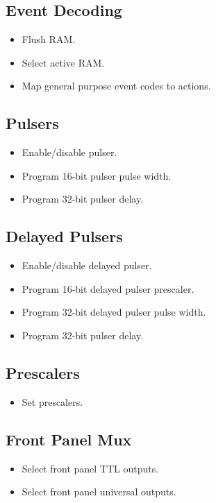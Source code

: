 \documentclass[a4paper,10pt]{article}
\begin{document}
	\subsection{Event Decoding}
	\begin{itemize}
		\item Flush RAM.
		\item Select active RAM.
		\item Map general purpose event codes to actions.
	\end{itemize}

	\subsection{Pulsers}
	\begin{itemize}
		\item Enable/disable pulser.
		\item Program 16-bit pulser pulse width.
		\item Program 32-bit pulser delay.
	\end{itemize}

	\subsection{Delayed Pulsers}
	\begin{itemize}
		\item Enable/disable delayed pulser.
		\item Program 16-bit delayed pulser prescaler.
		\item Program 32-bit delayed pulser pulse width.
		\item Program 32-bit pulser delay.
	\end{itemize}

	\subsection{Prescalers}
	\begin{itemize}
		\item Set prescalers.
	\end{itemize}

	\subsection{Front Panel Mux}
	\begin{itemize}
		\item Select front panel TTL outputs.
		\item Select front panel universal outputs.
	\end{itemize}
\end{document}
